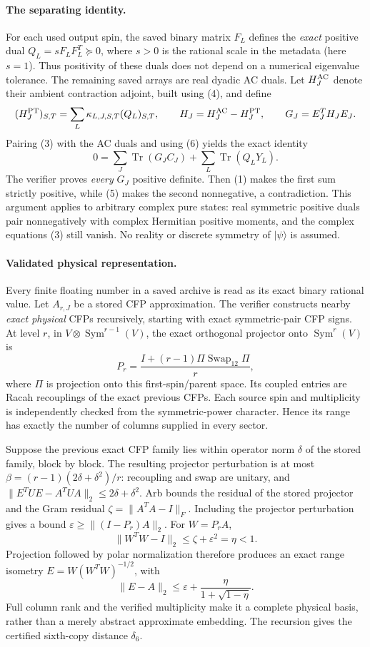 \documentclass[11pt]{article}
\newcommand{\Tr}{\operatorname{Tr}}
\newcommand{\Sym}{\operatorname{Sym}}
\begin{document}
\paragraph{The separating identity.}
For each used output spin, the saved binary matrix $F_L$ defines the
\emph{exact} positive dual
$Q_L=sF_LF_L^T\succeq0$, where $s>0$ is the rational scale in the
metadata (here $s=1$). Thus positivity of these duals does not depend on
a numerical eigenvalue tolerance. The remaining saved arrays are real
dyadic AC duals. Let $H_J^{\rm AC}$ denote their ambient contraction
adjoint, built using (4), and define
\[
 (H_J^{\rm PT})_{S,T}
      =\sum_L\kappa_{L,J,S,T}(Q_L)_{S,T},\qquad
 H_J=H_J^{\rm AC}-H_J^{\rm PT},\qquad G_J=E_J^TH_JE_J.
\]
Pairing (3) with the AC duals and using (6) yields the exact identity
\[
 0=\sum_J\Tr(G_JC_J)+\sum_L\Tr(Q_LY_L).              \tag{7}
\]
The verifier proves \emph{every} $G_J$ positive definite. Then (1)
makes the first sum strictly positive, while (5) makes the second
nonnegative, a contradiction. This argument applies to arbitrary
complex pure states: real symmetric positive duals pair nonnegatively
with complex Hermitian positive moments, and the complex equations (3)
still vanish. No reality or discrete symmetry of $|\psi\rangle$ is
assumed.

\paragraph{Validated physical representation.}
Every finite floating number in a saved archive is read as its exact
binary rational value. Let $A_{r,J}$ be a stored CFP approximation.
The verifier constructs nearby \emph{exact physical} CFPs recursively,
starting with exact symmetric-pair CFP signs. At level $r$, in
$V\otimes\Sym^{r-1}(V)$, the exact orthogonal projector onto
$\Sym^r(V)$ is
\[
 P_r=\frac{I+(r-1)\Pi\operatorname{Swap}_{12}\Pi}{r},             \tag{8}
\]
where $\Pi$ is projection onto this first-spin/parent space.
Its coupled entries are Racah recouplings of the exact previous CFPs.
Each source spin and multiplicity is independently checked from the
symmetric-power character. Hence its range has exactly the number of
columns supplied in every sector.

Suppose the previous exact CFP family lies within operator norm
$\delta$ of the stored family, block by block. The resulting projector
perturbation is at most
$\beta=(r-1)(2\delta+\delta^2)/r$: recoupling and swap are unitary, and
$\|E^TUE-A^TUA\|_2\le2\delta+\delta^2$.
Arb bounds the residual of the stored projector and the Gram residual
$\zeta=\|A^TA-I\|_F$. Including the projector perturbation gives a bound
$\varepsilon\ge\|(I-P_r)A\|_2$.
For $W=P_rA$,
\[
 \|W^TW-I\|_2\le\zeta+\varepsilon^2=\eta<1.
\]
Projection followed by polar normalization therefore produces an exact
range isometry $E=W(W^TW)^{-1/2}$, with
\[
 \|E-A\|_2\le
 \varepsilon+\frac{\eta}{1+\sqrt{1-\eta}}.                        \tag{9}
\]
Full column rank and the verified multiplicity make it a complete
physical basis, rather than a merely abstract approximate embedding.
The recursion gives the certified sixth-copy distance $\delta_6$.
\end{document}
